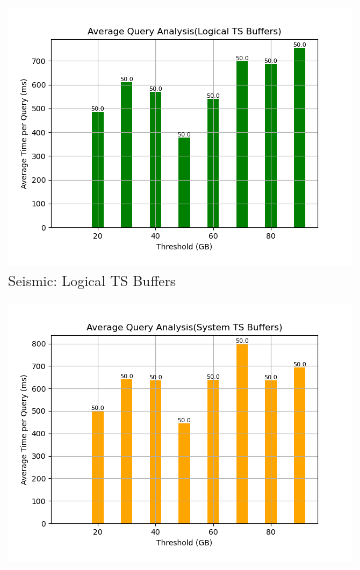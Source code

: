 \begin{figure}
	\centering
	\begin{subfigure}[c]{0.45\textwidth}
		\includegraphics[width=1\textwidth]   {figures/Experiments/Dynamic/SEISMIC/batch_answering/50/average_query_time_per_batch_version_999777015_10485760_10_delay[50].png}
		\caption{Seismic: Logical TS Buffers}
		\label{fig:logical-ts-50-seismic}
	\end{subfigure}
	\begin{subfigure}[c]{0.45\textwidth}
		\includegraphics[width=1\textwidth]	 {figures/Experiments/Dynamic/SEISMIC/batch_answering/50/average_query_time_per_batch_version_999777018_10485760_10_delay[50].png}

\end{subfigure}
\end{figure}
